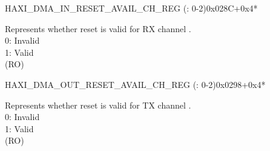 \begin{register}{H}{AXI\_DMA\_IN\_RESET\_AVAIL\_CH\_REG (: 0-2)}{0x028C+0x4*}\label{regdesc:AXIDMAINRESETAVAILCHNREG}
%
%
\regnewline%
\begin{regdesc}\begin{reglist}
\label{fielddesc:AXIDMAINRESETAVAILCHN}\item [AXI\_DMA\_IN\_RESET\_AVAIL\_CH\regindex{n}] Represents whether reset is valid for RX channel .\\0: Invalid\\1: Valid\\ (RO)
\end{reglist}\end{regdesc}
\end{register}


\begin{register}{H}{AXI\_DMA\_OUT\_RESET\_AVAIL\_CH\_REG (: 0-2)}{0x0298+0x4*}\label{regdesc:AXIDMAOUTRESETAVAILCHNREG}
%
%
\regnewline%
\begin{regdesc}\begin{reglist}
\label{fielddesc:AXIDMAOUTRESETAVAILCHN}\item [AXI\_DMA\_OUT\_RESET\_AVAIL\_CH\regindex{n}] Represents whether reset is valid for TX channel .\\0: Invalid\\1: Valid\\ (RO)
\end{reglist}\end{regdesc}
\end{register}


